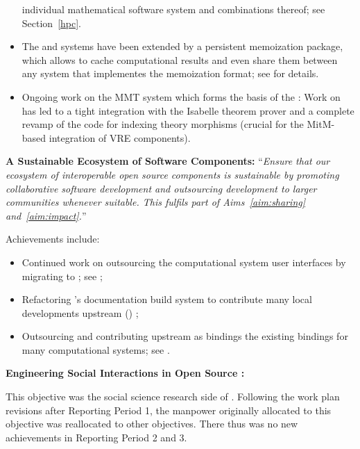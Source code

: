 \begin{compactenum}[\bf {Obj} 1\rm]
\begin{itemize}
    individual mathematical software system and combinations thereof;
    see Section~\ref{hpc}.
  \item The \Sage and \GAP systems have been extended by a persistent memoization package, which allows to cache computational results and even share them between any system that implementes the memoization format; see  for details.
  \item Ongoing work on the MMT system which forms the basis of the : Work on  has led to a tight integration with the Isabelle theorem prover and a complete revamp of the code for indexing theory morphisms (crucial for the MitM-based integration of VRE components).
  \end{itemize}

\item \label{objective:sustainable}
  \textbf{A Sustainable Ecosystem of Software Components:}
  ``\emph{Ensure that our ecosystem of
  interoperable open source components is \emph{sustainable} by
  promoting collaborative software development and outsourcing
  development to larger communities whenever suitable. This fulfils
  part of Aims~\ref{aim:sharing} and~\ref{aim:impact}.}''


  Achievements include:
  \begin{itemize}
  \item Continued work on outsourcing the computational system user
    interfaces by migrating to \Jupyter; see ;
  \item Refactoring \Sage's documentation build system to contribute many local developments
    upstream (\Sphinx) ;
  \item Outsourcing and contributing upstream as \Python bindings the existing \Sage
    bindings for many computational systems; see .
  \end{itemize}

\begingroup
\color{gray}
\item \label{objective:social}
  \textbf{Engineering Social Interactions in Open Source \VRE:}

  This objective was the social science research side of
  . Following the work plan revisions after
  Reporting Period 1, the manpower originally allocated to this
  objective was reallocated to other objectives. There thus was no new
  achievements in Reporting Period 2 and 3.


\end{compactenum}
